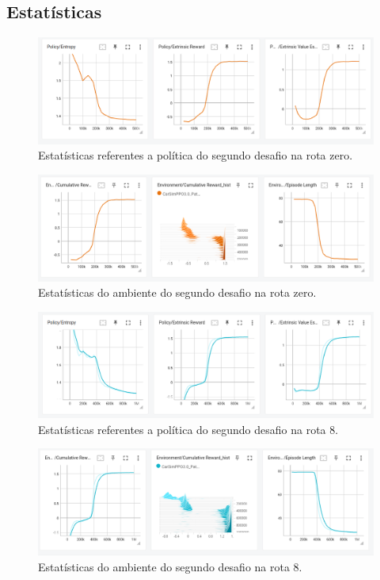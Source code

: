 \subsection*{Estatísticas}

\begin{figure}[h]
    \centering
    \includegraphics[scale=0.35]{figs/treinos/desafio-mediano/path0/politica.png}
    \caption{Estatísticas referentes a política do segundo desafio na rota zero.}
\end{figure}

\begin{figure}[h]
    \centering
    \includegraphics[scale=0.35]{figs/treinos/desafio-mediano/path0/ambiente.png}
    \caption{Estatísticas do ambiente do segundo desafio na rota zero.}
\end{figure}

\begin{figure}[h]
    \centering
    \includegraphics[scale=0.35]{figs/treinos/desafio-mediano/path8/politica.png}
    \caption{Estatísticas referentes a política do segundo desafio na rota 8.}
\end{figure}

\begin{figure}[h]
    \centering
    \includegraphics[scale=0.35]{figs/treinos/desafio-mediano/path8/ambiente.png}
    \caption{Estatísticas do ambiente do segundo desafio na rota 8.}
\end{figure}
